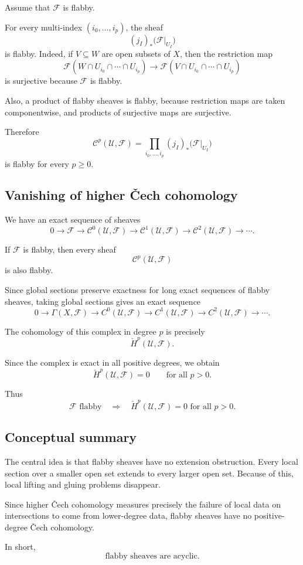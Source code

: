 Assume that $\mathcal F$ is flabby.

For every multi-index $(i_0,\ldots,i_p)$, the sheaf
\[
(j_I)_*\bigl(\mathcal F|_{U_I}\bigr)
\]
is flabby. Indeed, if $V\subseteq W$ are open subsets of $X$, then the
restriction map
\[
\mathcal F(W\cap U_{i_0}\cap\cdots\cap U_{i_p})
\longrightarrow
\mathcal F(V\cap U_{i_0}\cap\cdots\cap U_{i_p})
\]
is surjective because $\mathcal F$ is flabby.

Also, a product of flabby sheaves is flabby, because restriction maps are
taken componentwise, and products of surjective maps are surjective.

Therefore
\[
\mathcal C^p(\mathcal U,\mathcal F)
=
\prod_{i_0,\ldots,i_p}
(j_I)_*\bigl(\mathcal F|_{U_I}\bigr)
\]
is flabby for every $p\geq 0$.

\subsection*{Vanishing of higher \v{C}ech cohomology}

We have an exact sequence of sheaves
\[
0\longrightarrow \mathcal F
\longrightarrow \mathcal C^0(\mathcal U,\mathcal F)
\longrightarrow \mathcal C^1(\mathcal U,\mathcal F)
\longrightarrow \mathcal C^2(\mathcal U,\mathcal F)
\longrightarrow \cdots.
\]

If $\mathcal F$ is flabby, then every sheaf
\[
\mathcal C^p(\mathcal U,\mathcal F)
\]
is also flabby.

Since global sections preserve exactness for long exact sequences of flabby
sheaves, taking global sections gives an exact sequence
\[
0\longrightarrow \Gamma(X,\mathcal F)
\longrightarrow C^0(\mathcal U,\mathcal F)
\longrightarrow C^1(\mathcal U,\mathcal F)
\longrightarrow C^2(\mathcal U,\mathcal F)
\longrightarrow \cdots.
\]

The cohomology of this complex in degree $p$ is precisely
\[
\check H^p(\mathcal U,\mathcal F).
\]

Since the complex is exact in all positive degrees, we obtain
\[
\check H^p(\mathcal U,\mathcal F)=0
\qquad
\text{for all }p>0.
\]

Thus
\[
\boxed{
	\mathcal F \text{ flabby}
	\quad\Longrightarrow\quad
	\check H^p(\mathcal U,\mathcal F)=0
	\text{ for all }p>0.
}
\]

\subsection{Conceptual summary}

The central idea is that flabby sheaves have no extension obstruction.
Every local section over a smaller open set extends to every larger open
set. Because of this, local lifting and gluing problems disappear.

Since higher \v{C}ech cohomology measures precisely the failure of local
data on intersections to come from lower-degree data, flabby sheaves have no
positive-degree \v{C}ech cohomology.

In short,
\[
\boxed{
	\text{flabby sheaves are acyclic.}
}
\]

